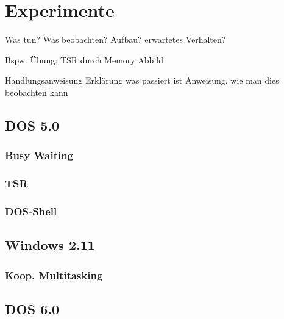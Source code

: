 \chapter{Experimente}
\label{chap:experiments}

Was tun?
Was beobachten?
Aufbau?
erwartetes Verhalten?

Bspw. Übung: TSR durch Memory Abbild


Handlungsanweisung
Erklärung was passiert ist
Anweisung, wie man dies beobachten kann

\section{DOS 5.0}

	\subsection{Busy Waiting}
	\subsection{TSR}
	\subsection{DOS-Shell}

\section{Windows 2.11}

	\subsection{Koop. Multitasking}

\section{DOS 6.0}

